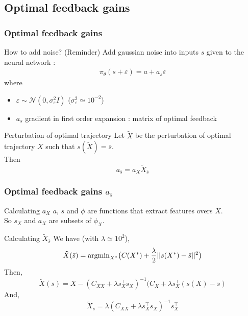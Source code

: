 \documentclass[mathserif]{beamer}
\begin{document}
\subsection{Optimal feedback gains}

\begin{frame}
  \frametitle{{Optimal feedback gains}}
   \begin{block}{How to add noise? (Reminder)}
  Add gaussian noise into inputs $s$ given to the neural network : 
  \begin{align*}
  \pi_{\theta}(s + \varepsilon) = a + a_{s}\varepsilon 
  \end{align*}
  where 
  \begin{itemize}
  \item $\varepsilon \sim \mathcal{N}(0,\sigma_{\varepsilon}^{2}I)$ \hspace{5mm} ($\sigma_{\varepsilon}^{2} \simeq 10^{-2}$)
  \item $a_s$ gradient in first order expansion : matrix of optimal feedback
  \end{itemize}
  \end{block}
  
  \begin{block}{Perturbation of optimal trajectory}
  Let $\tilde{X}$ be the perturbation of optimal trajectory $X$ such that $s(\tilde{X}) = \bar{s} $. \\
  Then 
  \[
  a_{\bar{s}} = a_{X}\tilde{X}_{\bar{s}}
  \]
  \end{block}
  
  \end{frame}



\begin{frame}
	\frametitle{{Optimal feedback gains $a_{\bar{s}}$}}
	\begin{block}{Calculating $a_{X}$}
	$a$, $s$ and $\phi$ are functions that extract features overs $X$. \\
	So $s_X$ and $a_X$ are subsets of $\phi_X$. 
	\end{block}
	
  \begin{block}{Calculating $\tilde{X}_{\bar{s}}$}
  We have (with $\lambda \simeq 10^2$),
  \[
  \tilde{X}(\bar{s}) = \text{argmin}_{X^{*}} \big{(}C(X^{*}) + \frac{\lambda}{2}||s(X^{*}) - \bar{s}||^{2}\big{)}
  \]
    Then,
    \[
  \tilde{X}(\bar{s}) = X - (C_{XX} + \lambda s_{X}^{\top}s_{X})^{-1}(C_{X} + \lambda s_{X}^{\top}(s(X) - \bar{s})
  \]
  And, 
  \[
  \tilde{X}_{\bar{s}} = \lambda(C_{XX} + \lambda s_{X}^{\top}s_{X})^{-1}s_{X}^{\top}
  \]
  \end{block}
\end{frame}
\end{document}
